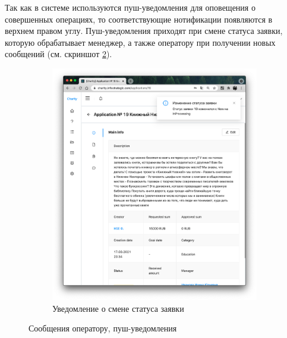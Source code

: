 \documentclass[a4paper,12pt,reqno]{article}
\begin{document}
	Так как в системе используются пуш-уведомления для оповещения о совершенных операциях, то соответствующие нотификации появляются в верхнем правом углу. Пуш-уведомления приходят при смене статуса заявки, которую обрабатывает менеджер, а также оператору при получении новых сообщений (см. скриншот \ref{pic: firebase}).
	
	\begin{figure}[H]
		\centering
		\begin{subfigure}[b]{0.45\linewidth}
			\includegraphics[width=\linewidth]{img/ro/push.png}
			\caption{\label{pic: firebase_push} Уведомление о смене статуса заявки}
		\end{subfigure}
		\caption{\label{pic: firebase} Сообщения оператору, пуш-уведомления}
	\end{figure}
	
\end{document}
